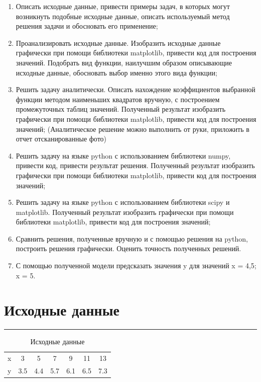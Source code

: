 \documentclass[a4paper, 14pt]{extarticle}
\begin{document}
\begin{enumerate}
    \item Описать исходные данные, привести примеры задач, в которых могут возникнуть подобные исходные данные, описать используемый метод решения задачи и обосновать его применение;
    \item Проанализировать исходные данные. Изобразить исходные данные графически при помощи библиотеки matplotlib, привести код для построения значений. Подобрать вид функции, наилучшим образом описывающие исходные данные, обосновать выбор именно этого вида функции;
    \item Решить задачу аналитически. Описать нахождение коэффициентов выбранной функции методом наименьших квадратов вручную, с построением промежуточных таблиц значений. Полученный результат изобразить графически при помощи библиотеки matplotlib, привести код для построения значений; (Аналитическое решение можно выполнить от руки, приложить в отчет отсканированные фото)
    \item Решить задачу на языке python с использованием библиотеки numpy, привести код, привести результат решения. Полученный результат изобразить графически при помощи библиотеки matplotlib, привести код для построения значений;
    \item Решить задачу на языке python с использованием библиотеки scipy и matplotlib. Полученный результат изобразить графически при помощи библиотеки matplotlib, привести код для построения значений;
    \item Сравнить решения, полученные вручную и с помощью решения на python, построить решения графически.  Оценить точность полученных решений.
    \item С помощью полученной модели предсказать значения y для значений x = 4,5; x = 5.
\end{enumerate}

\section*{Исходные данные}\vspace{-20pt}\rule{\linewidth}{0.1mm}

\begin{table}[h!]
    \centering
    \begin{adjustbox}{max width=1\textwidth}
    \setlength{\tabcolsep}{20pt} %
    \begin{tabular}{l!{\vrule width 1pt}cccccc}
        \toprule
        x & 3 & 5 & 7 & 9 & 11 & 13 \\
        y & 3.5 & 4.4 & 5.7 & 6.1 & 6.5 & 7.3 \\
        \bottomrule
    \end{tabular}
    \end{adjustbox}
    \caption{Исходные данные}
    \label{tab:sample_table}
\end{table}
\end{document}
